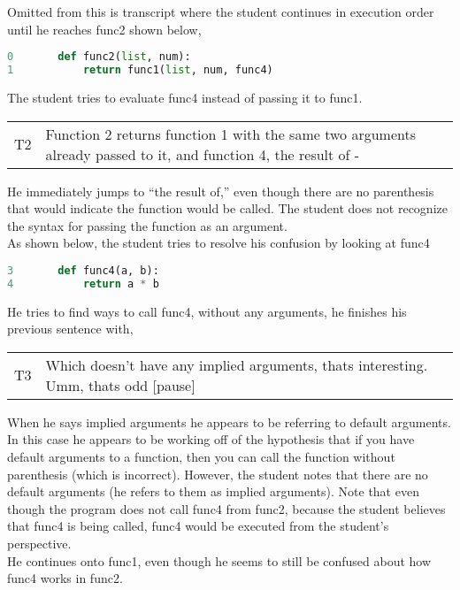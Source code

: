 Omitted from this is transcript where the student continues in execution order until he reaches func2 shown below,

\begin{lstlisting}[language=python]
0		def func2(list, num):
1			return func1(list, num, func4)
\end{lstlisting}

The student tries to evaluate func4 instead of passing it to func1.

\begin{tabular}{lp{13cm}}
T2&Function 2 returns function 1 with the same two arguments already passed to it, and function 4, the result of -\\
\end{tabular}

He immediately jumps to ``the result of,'' even though there are no parenthesis that would indicate the function would be called.
The student does not recognize the syntax for passing the function as an argument. \\

As shown below, the student tries to resolve his confusion by looking at func4

\begin{lstlisting}[language=python]
3		def func4(a, b):
4			return a * b
\end{lstlisting}

He tries to find ways to call func4, without any arguments, he finishes his previous sentence with,

\begin{tabular}{lp{13cm}}
T3&Which doesn't have any implied arguments, thats interesting. Umm, thats odd [pause]\\
\end{tabular}

When he says implied arguments he appears to be referring to default arguments.
In this case he appears to be working off of the hypothesis that if you have default arguments to a function,
  then you can call the function without parenthesis (which is incorrect).
However, the student notes that there are no default arguments (he refers to them as implied arguments).
Note that even though the program does not call func4 from func2, because the student believes that func4 is being called, func4 would be executed from the student's perspective. \\

He continues onto func1, even though he seems to still be confused about how func4 works in func2.

